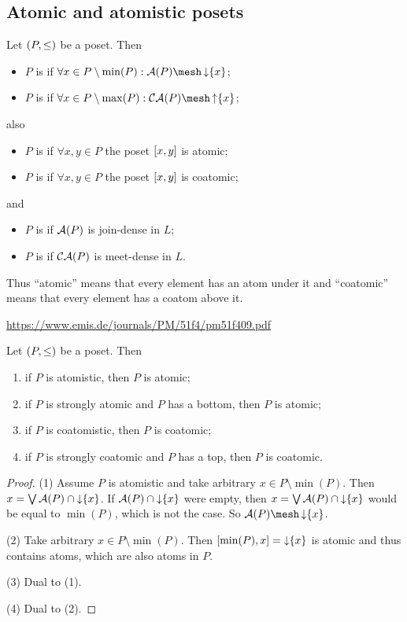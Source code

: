 \subsection{Atomic and atomistic posets}
\begin{definition}
Let $\sSet{P,\leq}$ be a poset. Then
\begin{itemize}
\item $P$ is  if $\forall x\in P\setminus\min(P): \atoms(P)\mesh \downset\{x\}$;
\item $P$ is  if $\forall x\in P\setminus\max(P): \coatoms(P)\mesh \upset\{x\}$;
\end{itemize}
also
\begin{itemize}
\item $P$ is  if $\forall x,y\in P$ the poset $\interval{x,y}$ is atomic;
\item $P$ is  if $\forall x,y \in P$ the poset $\interval{x,y}$ is coatomic;
\end{itemize}
and
\begin{itemize}
\item $P$ is  if $\operatorname{\mathcal{A}}(P)$ is join-dense in $L$;
\item $P$ is  if $\operatorname{\mathcal{CA}}(P)$ is meet-dense in $L$.
\end{itemize}
\end{definition}
Thus ``atomic'' means that every element has an atom under it and ``coatomic'' means that every element has a coatom above it.

\url{https://www.emis.de/journals/PM/51f4/pm51f409.pdf}

\begin{lemma}
Let $\sSet{P,\leq}$ be a poset. Then
\begin{enumerate}
\item if $P$ is atomistic, then $P$ is atomic;
\item if $P$ is strongly atomic and $P$ has a bottom, then $P$ is atomic;
\item if $P$ is coatomistic, then $P$ is coatomic;
\item if $P$ is strongly coatomic and $P$ has a top, then $P$ is coatomic.
\end{enumerate}
\end{lemma}
\begin{proof}
(1) Assume $P$ is atomistic and take arbitrary $x\in P\setminus\min(P)$. Then $x = \bigvee \operatorname{\mathcal{A}}(P)\cap \operatorname{\downarrow}\{x\}$. If $\operatorname{\mathcal{A}}(P)\cap \operatorname{\downarrow}\{x\}$ were empty, then $x = \bigvee \operatorname{\mathcal{A}}(P)\cap \operatorname{\downarrow}\{x\}$ would be equal to $\min(P)$, which is not the case. So $\atoms(P)\mesh \downset\{x\}$.

(2) Take arbitrary $x\in P\setminus\min(P)$. Then $\interval{\min(P), x} = \downset\{x\}$ is atomic and thus contains atoms, which are also atoms in $P$.

(3) Dual to (1).

(4) Dual to (2).
\end{proof}

